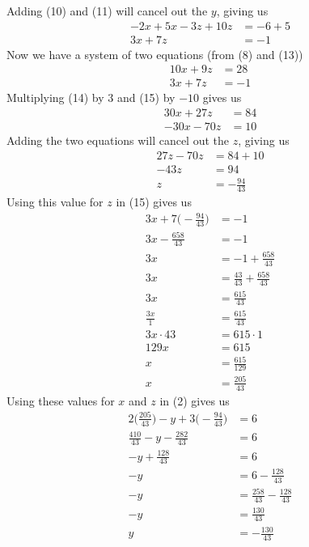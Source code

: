 \documentclass[12pt]{article}
\begin{document}
Adding (10) and (11) will cancel out the $y$, giving us
\begin{align}
-2x+5x-3z+10z&=-6+5 \\
3x+7z&=-1
\end{align}
Now we have a system of two equations (from (8) and (13))
\begin{align}
10x+9z&=28 \\
3x+7z&=-1
\end{align}
Multiplying (14) by 3 and (15) by $-10$ gives us
\begin{align*}
30x+27z&=84 \\
-30x-70z&=10
\end{align*}
Adding the two equations will cancel out the $z$, giving us
\begin{align*}
27z-70z&=84+10 \\
-43z&=94 \\
z&=-\displaystyle \frac{94}{43}
\end{align*}
Using this value for $z$ in (15) gives us
\begin{align*}
3x+7\bigg(-\displaystyle \frac{94}{43}\bigg)&=-1 \\
3x-\displaystyle \frac{658}{43}&=-1 \\
3x&=-1+\displaystyle \frac{658}{43} \\
3x&=\displaystyle \frac{43}{43}+\displaystyle \frac{658}{43} \\
3x&=\displaystyle \frac{615}{43} \\
\displaystyle \frac{3x}{1}&=\displaystyle \frac{615}{43} \\
3x\cdot43&=615\cdot1 \\
129x&=615 \\
x&=\displaystyle \frac{615}{129} \\
x&=\displaystyle \frac{205}{43}
\end{align*}
Using these values for $x$ and $z$ in (2) gives us
\begin{align*}
2\bigg(\displaystyle \frac{205}{43}\bigg)-y+3\bigg(-\displaystyle \frac{94}{43}\bigg)&=6 \\
\displaystyle \frac{410}{43}-y-\displaystyle \frac{282}{43}&=6 \\
-y+\displaystyle \frac{128}{43}&=6 \\
-y&=6-\displaystyle \frac{128}{43} \\
-y&=\displaystyle \frac{258}{43}-\displaystyle \frac{128}{43} \\
-y&=\displaystyle \frac{130}{43} \\
y&=-\displaystyle \frac{130}{43}
\end{align*}
\end{document}
